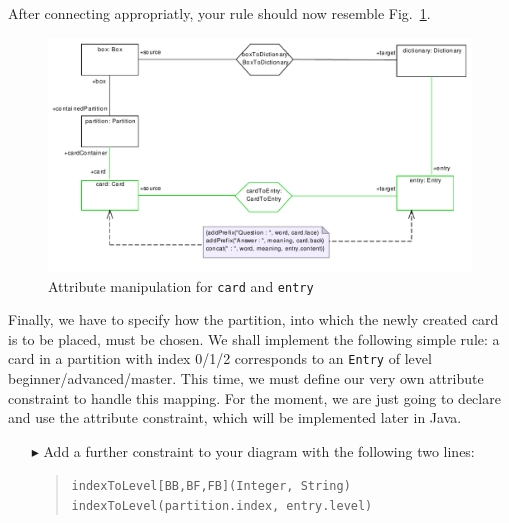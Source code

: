 After connecting appropriatly, your rule should now resemble Fig.~\ref{fig:cardtoentry_2}.

\begin{figure}[htbp]
\begin{center}
  \includegraphics[width=\textwidth]{pics/tggBilder/tggRule/tgg20}
  \caption{Attribute manipulation for \texttt{card} and \texttt{entry}}  
  \label{fig:cardtoentry_2}
\end{center}
\end{figure}

Finally, we have to specify how the partition, into which the newly created card is to be placed, must be chosen.
We shall implement the following simple rule: a card in a partition with index 0/1/2 corresponds to an \texttt{Entry} of level beginner/advanced/master.
This time, we must define our very own attribute constraint to handle this mapping.
For the moment, we are just going to declare and use the attribute constraint, which will be implemented later in Java.

\clearpage

\begin{enumerate}
\item[$\blacktriangleright$] Add a further constraint to your diagram with the following two lines:
\begin{quotation}
\noindent \texttt{indexToLevel[BB,BF,FB](Integer, String)}\\ 
\texttt{indexToLevel(partition.index, entry.level)} 
\end{quotation}
\end{enumerate}

